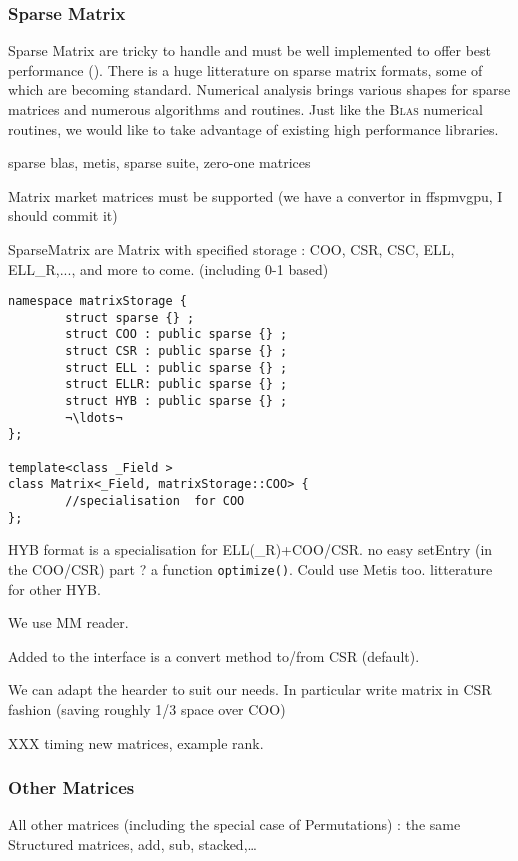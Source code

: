 \subsubsection{Sparse Matrix}
%
Sparse Matrix are tricky to handle and must be well implemented to offer best
\applin performance (\cf \cite{Boyer:2010:spmv}). There is a huge litterature
on sparse matrix formats, some of which are becoming standard. Numerical
analysis brings various shapes for sparse matrices and numerous algorithms and
routines.  Just like the \textsc{Blas} numerical routines, we would like to
take advantage of existing high performance libraries.
%
\par
%
\danger sparse blas, metis, sparse suite, zero-one matrices
%
\par
%
Matrix market matrices must be supported (we have a convertor in ffspmvgpu, I should commit it)
%
\par
%
SparseMatrix are Matrix with specified storage : COO, CSR, CSC, ELL,
ELL\_R,..., and more to come. (including 0-1 based)
%
\par
%
{
\def\indexTrait{other}
\begin{lstlisting}
namespace matrixStorage {
        struct sparse {} ;
        struct COO : public sparse {} ;
        struct CSR : public sparse {} ;
        struct ELL : public sparse {} ;
        struct ELLR: public sparse {} ;
        struct HYB : public sparse {} ;
        ¬\ldots¬
};

template<class _Field >
class Matrix<_Field, matrixStorage::COO> {
        //specialisation  for COO
};
\end{lstlisting}
}

%
\par
 HYB format is a specialisation for ELL(\_R)+COO/CSR. no easy setEntry (in the
COO/CSR) part ? a function \texttt{optimize()}. Could use \textsf{Metis} too.
litterature for other HYB.
\par
We use MM reader.
\par
Added to the interface is a convert method to/from CSR (default).
%
\par
%
We can adapt the hearder to suit our needs. In particular write matrix in CSR
fashion (saving roughly 1/3 space over COO)
%
\par
%
XXX timing new matrices, example rank.
%
\subsubsection{Other Matrices}
%
All other matrices (including the special case of Permutations) : the same
Structured matrices, add, sub, stacked,\dots
%
